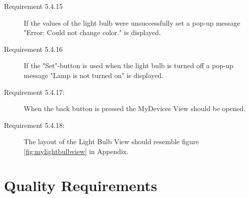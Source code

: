 \documentclass[a4paper]{article}
\begin{document}
\begin{description}
\item[Requirement 5.4.15] If the values of the light bulb were unsuccessfully set a pop-up message "Error: Could not change color." is displayed.

\item[Requirement 5.4.16] If the "Set"-button is used when the light bulb is turned off a pop-up message "Lamp is not turned on" is displayed.

\item[Requirement 5.4.17:] When the back button is pressed the MyDevices View should be opened.

\item[Requirement 5.4.18:] The layout of the Light Bulb View should resemble figure \ref{fig:mylightbulbview} in Appendix.

\end{description}

\section{Quality Requirements}
\end{document}
